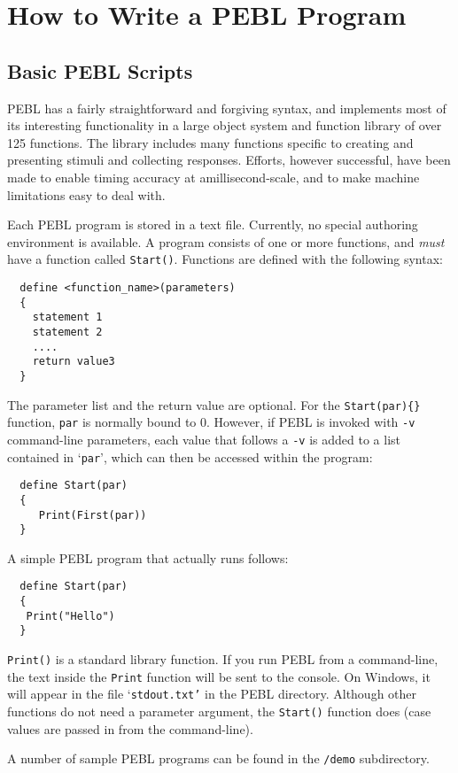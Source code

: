 
\chapter{How to Write a PEBL Program}


\section{Basic PEBL Scripts}

PEBL has a fairly straightforward and forgiving syntax, and implements
most of its interesting functionality in a large object system and
function library of over 125 functions.  The library includes many
functions specific to creating and presenting stimuli and collecting
responses.  Efforts, however successful, have been made to enable
timing accuracy at amillisecond-scale, and to make machine limitations
easy to deal with.


Each PEBL program is stored in a text file. Currently, no
special authoring environment is available. A program
consists of one or more functions, and \emph{must} have a function
called \texttt{Start()}. Functions are defined with the following
syntax:
\begin{verbatim}
  define <function_name>(parameters)
  {
    statement 1
    statement 2
    ....
    return value3
  }
\end{verbatim}
The parameter list and the return value are optional.  For the
\verb+Start(par){}+ function, \texttt{par} is normally bound to 0.
However, if PEBL is invoked with \texttt{-v} command-line parameters,
each value that follows a \texttt{-v} is added to a list contained in
`\texttt{par}', which can then be accessed within the program:
\begin{verbatim}
  define Start(par)
  {
     Print(First(par))
  }
\end{verbatim}
A simple PEBL program that actually runs follows:
\begin{verbatim}
  define Start(par)
  {
   Print("Hello")
  }
\end{verbatim}
\texttt{Print()} is a standard library function. If you run PEBL from a
command-line, the text inside the \texttt{Print} function will be sent to the
console. On Windows, it will appear in the file `\texttt{stdout.txt'} in the
PEBL directory.  Although other functions do not need a parameter
argument, the \texttt{Start()} function does (case values are passed in
from the command-line).

A number of sample PEBL programs can be found in the \texttt{/demo}
 subdirectory.




